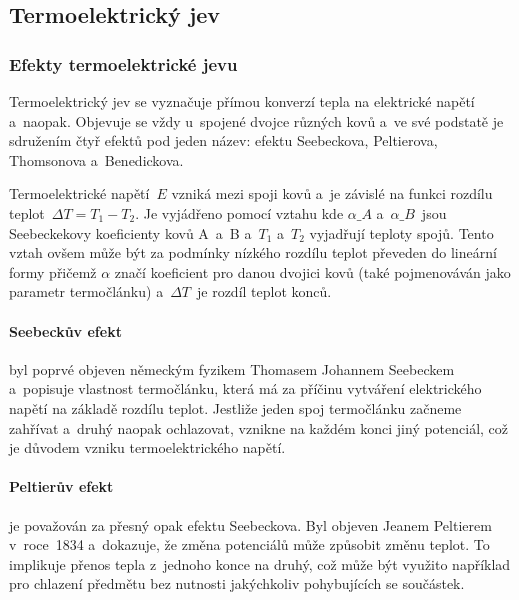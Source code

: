 \subsection{Termoelektrický jev}
\subsubsection{Efekty termoelektrické jevu}
\label{sec:efekty-termoelektrika}
Termoelektrický jev se vyznačuje přímou konverzí tepla na elektrické napětí
a~naopak. Objevuje se vždy u~spojené dvojce různých kovů a~ve své podstatě je
sdružením čtyř efektů pod jeden název: efektu Seebeckova, Peltierova,
Thomsonova a~Benedickova.~

Termoelektrické napětí~$E$ vzniká mezi spoji kovů a~je závislé na funkci
rozdílu teplot~$\Delta T = T_1 - T_2$. Je vyjádřeno pomocí vztahu
kde $\alpha\_A$ a~$\alpha\_B$~jsou  Seebeckekovy koeficienty kovů A~a~B a~$T_1$
a~$T_2$ vyjadřují teploty spojů. Tento vztah ovšem může být za podmínky
nízkého rozdílu teplot převeden do lineární formy
přičemž $\alpha$ značí koeficient pro danou dvojici kovů (také pojmenováván
jako parametr termočlánku) a~$\Delta T$~je rozdíl teplot konců.~\cite{diplomka}

\paragraph{Seebeckův efekt} byl poprvé objeven německým fyzikem Thomasem
Johannem Seebeckem a~popisuje vlastnost termočlánku, která má za příčinu
vytváření elektrického napětí na základě rozdílu teplot. Jestliže jeden spoj
termočlánku začneme zahřívat a~druhý naopak ochlazovat, vznikne na každém konci
jiný potenciál, což je důvodem vzniku termoelektrického
napětí.~\cite{jreichl-seebeck}

\paragraph{Peltierův efekt} je považován za přesný opak efektu Seebeckova. Byl
objeven Jeanem Peltierem v~roce~1834 a~dokazuje, že změna potenciálů může
způsobit změnu teplot. To implikuje přenos tepla z~jednoho konce na druhý, což
může být využito například pro chlazení předmětu bez nutnosti jakýchkoliv
pohybujících se součástek.~


